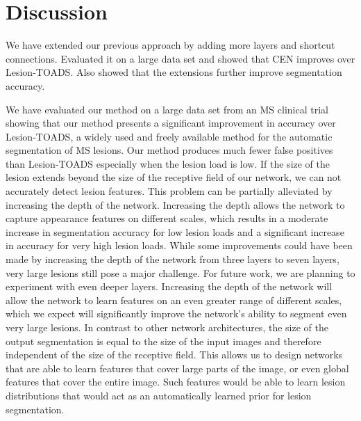 \section{Discussion}


We have extended our previous approach by adding more layers and shortcut
connections. Evaluated it on a large data set and showed that CEN improves
over Lesion-TOADS. Also showed that the extensions further improve segmentation
accuracy.

We have evaluated our method on a large data set from an MS clinical trial
showing that our method presents a significant improvement in accuracy over
Lesion-TOADS, a widely used and freely available method for the automatic
segmentation of MS lesions. Our method produces much fewer false positives than
Lesion-TOADS especially when the lesion load is low. If the size of the lesion
extends beyond the size of the receptive field of our network, we can not
accurately detect lesion features. This problem can be partially alleviated by
increasing the depth of the network. Increasing the depth allows the network to
capture appearance features on different scales, which results in a moderate
increase in segmentation accuracy for low lesion loads and a significant
increase in accuracy for very high lesion loads. While some improvements could
have been made by increasing the depth of the network from three layers to seven
layers, very large lesions still pose a major challenge. For future work, we are
planning to experiment with even deeper layers. Increasing the depth of the
network will allow the network to learn features on an even greater range of
different scales, which we expect will significantly improve the network's
ability to segment even very large lesions. In contrast to other network
architectures, the size of the output segmentation is equal to the size of the
input images and therefore independent of the size of the receptive field. This
allows us to design networks that are able to learn features that cover large
parts of the image, or even global features that cover the entire image. Such
features would be able to learn lesion distributions that would act as an
automatically learned prior for lesion segmentation.

